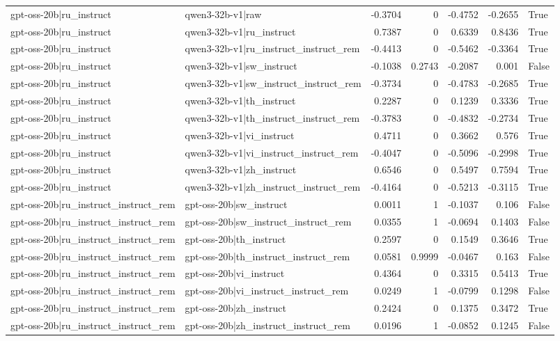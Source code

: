 \begin{table}
\begin{tabular}{l l r r r r l}
gpt-oss-20b|ru_instruct & qwen3-32b-v1|raw & -0.3704 & 0 & -0.4752 & -0.2655 & True \\
gpt-oss-20b|ru_instruct & qwen3-32b-v1|ru_instruct & 0.7387 & 0 & 0.6339 & 0.8436 & True \\
gpt-oss-20b|ru_instruct & qwen3-32b-v1|ru_instruct_instruct_rem & -0.4413 & 0 & -0.5462 & -0.3364 & True \\
gpt-oss-20b|ru_instruct & qwen3-32b-v1|sw_instruct & -0.1038 & 0.2743 & -0.2087 & 0.001 & False \\
gpt-oss-20b|ru_instruct & qwen3-32b-v1|sw_instruct_instruct_rem & -0.3734 & 0 & -0.4783 & -0.2685 & True \\
gpt-oss-20b|ru_instruct & qwen3-32b-v1|th_instruct & 0.2287 & 0 & 0.1239 & 0.3336 & True \\
gpt-oss-20b|ru_instruct & qwen3-32b-v1|th_instruct_instruct_rem & -0.3783 & 0 & -0.4832 & -0.2734 & True \\
gpt-oss-20b|ru_instruct & qwen3-32b-v1|vi_instruct & 0.4711 & 0 & 0.3662 & 0.576 & True \\
gpt-oss-20b|ru_instruct & qwen3-32b-v1|vi_instruct_instruct_rem & -0.4047 & 0 & -0.5096 & -0.2998 & True \\
gpt-oss-20b|ru_instruct & qwen3-32b-v1|zh_instruct & 0.6546 & 0 & 0.5497 & 0.7594 & True \\
gpt-oss-20b|ru_instruct & qwen3-32b-v1|zh_instruct_instruct_rem & -0.4164 & 0 & -0.5213 & -0.3115 & True \\
gpt-oss-20b|ru_instruct_instruct_rem & gpt-oss-20b|sw_instruct & 0.0011 & 1 & -0.1037 & 0.106 & False \\
gpt-oss-20b|ru_instruct_instruct_rem & gpt-oss-20b|sw_instruct_instruct_rem & 0.0355 & 1 & -0.0694 & 0.1403 & False \\
gpt-oss-20b|ru_instruct_instruct_rem & gpt-oss-20b|th_instruct & 0.2597 & 0 & 0.1549 & 0.3646 & True \\
gpt-oss-20b|ru_instruct_instruct_rem & gpt-oss-20b|th_instruct_instruct_rem & 0.0581 & 0.9999 & -0.0467 & 0.163 & False \\
gpt-oss-20b|ru_instruct_instruct_rem & gpt-oss-20b|vi_instruct & 0.4364 & 0 & 0.3315 & 0.5413 & True \\
gpt-oss-20b|ru_instruct_instruct_rem & gpt-oss-20b|vi_instruct_instruct_rem & 0.0249 & 1 & -0.0799 & 0.1298 & False \\
gpt-oss-20b|ru_instruct_instruct_rem & gpt-oss-20b|zh_instruct & 0.2424 & 0 & 0.1375 & 0.3472 & True \\
gpt-oss-20b|ru_instruct_instruct_rem & gpt-oss-20b|zh_instruct_instruct_rem & 0.0196 & 1 & -0.0852 & 0.1245 & False \\

\end{tabular}
\end{table}
